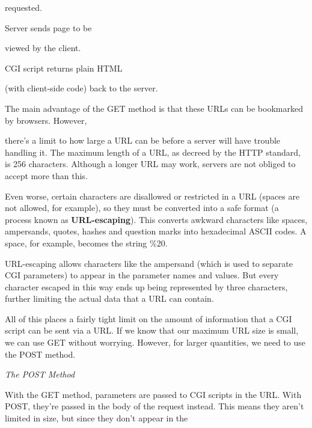 \documentclass[a4paper,11pt]{book}
\begin{document}
\noindent requested.     \underbar{  }

\noindent 

\noindent 

\noindent 

\noindent 

    Server sends page to be

\noindent viewed by the client.

     CGI script returns plain HTML

\noindent (with client-side code) back to the server.

\noindent 

\noindent 

\noindent 

\noindent The main advantage of the GET method is that these URLs can be bookmarked by browsers. However,

\noindent there's a limit to how large a URL can be before a server will have trouble handling it. The maximum length of a URL, as decreed by the HTTP standard, is 256 characters. Although a longer URL may work, servers are not obliged to accept more than this.

\noindent 

\noindent Even worse, certain characters are disallowed or restricted in a URL (spaces are not allowed, for example), so they must be converted into a safe format (a process known as \textbf{URL-escaping}). This converts awkward characters like spaces, ampersands, quotes, hashes and question marks into hexadecimal ASCII codes. A space, for example, becomes the string \%20.

\noindent 

\noindent URL-escaping allows characters like the ampersand (which is used to separate CGI parameters) to appear in the parameter names and values. But every character escaped in this way ends up being represented by three characters, further limiting the actual data that a URL can contain.

\noindent 

\noindent All of this places a fairly tight limit on the amount of information that a CGI script can be sent via a URL. If we know that our maximum URL size is small, we can use GET without worrying. However, for larger quantities, we need to use the POST method.

\noindent 

\noindent \textit{The POST Method}

\noindent With the GET method, parameters are passed to CGI scripts in the URL. With POST, they're passed in the body of the request instead. This means they aren't limited in size, but since they don't appear in the
\end{document}
